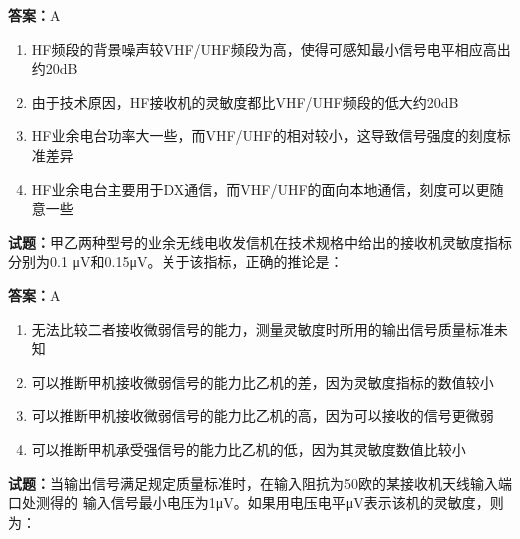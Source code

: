 \documentclass{ctexbook}
\begin{document}
\textbf{答案：}A 

\begin{enumerate}[leftmargin=3em]
  \item HF频段的背景噪声较VHF/UHF频段为高，使得可感知最小信号电平相应高出约20dB 

  \item 由于技术原因，HF接收机的灵敏度都比VHF/UHF频段的低大约20dB 

  \item HF业余电台功率大一些，而VHF/UHF的相对较小，这导致信号强度的刻度标准差异 

  \item HF业余电台主要用于DX通信，而VHF/UHF的面向本地通信，刻度可以更随意一些 

\end{enumerate}





\vspace{1em}

\textbf{试题：}甲乙两种型号的业余无线电收发信机在技术规格中给出的接收机灵敏度指标分别为0.1
μV和0.15μV。关于该指标，正确的推论是： 

\textbf{答案：}A 

\begin{enumerate}[leftmargin=3em]
  \item 无法比较二者接收微弱信号的能力，测量灵敏度时所用的输出信号质量标准未知 

  \item 可以推断甲机接收微弱信号的能力比乙机的差，因为灵敏度指标的数值较小 

  \item 可以推断甲机接收微弱信号的能力比乙机的高，因为可以接收的信号更微弱 

  \item 可以推断甲机承受强信号的能力比乙机的低，因为其灵敏度数值比较小 

\end{enumerate}





\vspace{1em}

\textbf{试题：}当输出信号满足规定质量标准时，在输入阻抗为50欧的某接收机天线输入端口处测得的
输入信号最小电压为1μV。如果用电压电平μV表示该机的灵敏度，则为： 
\end{document}
